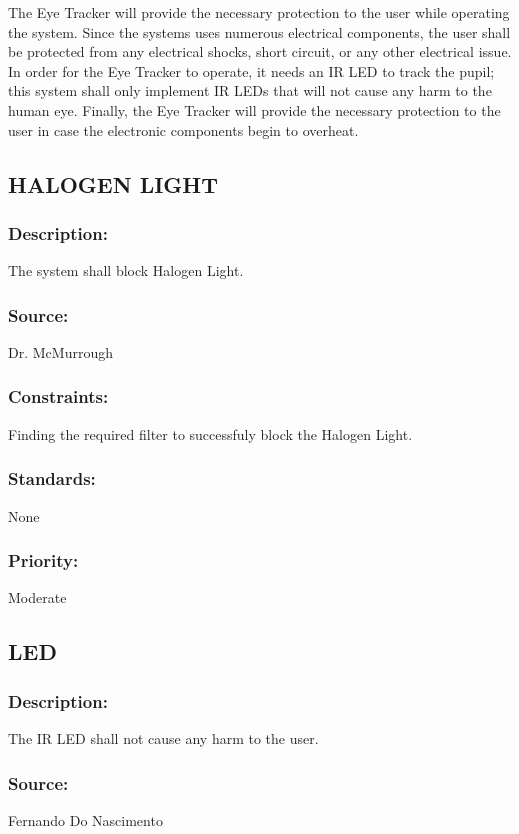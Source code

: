 The Eye Tracker will provide the necessary protection to the user while operating the system. Since the systems uses numerous electrical components, the user shall be protected from any electrical shocks, short circuit, or any other electrical issue. In order for the Eye Tracker to operate, it needs an IR LED to track the pupil; this system shall only implement IR LEDs that will not cause any harm to the human eye. Finally, the Eye Tracker will provide the necessary protection to the user in case the electronic components begin to overheat.

\subsection{\text HALOGEN LIGHT}
\subsubsection{Description:} 
	{The system shall block Halogen Light.}
\subsubsection{Source:} 
	{Dr. McMurrough}
\subsubsection{Constraints:} 
	{Finding the required filter to successfuly block the Halogen Light.}
\subsubsection{Standards:} 
	{None}
\subsubsection{Priority:} 
	{Moderate}
\newline
\newline
	
\subsection{\text LED}
\subsubsection{Description:} 
	{The IR LED shall not cause any harm to the user.}
\subsubsection{Source:} 
	{Fernando Do Nascimento}
